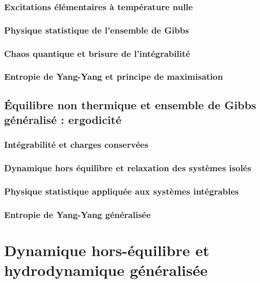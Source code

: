 \section{Excitations élémentaires à température nulle}
\section{Physique statistique de l’ensemble de Gibbs}

\section{Chaos quantique et brisure de l’intégrabilité}
\section{Entropie de Yang-Yang et principe de maximisation}

\chapter{Équilibre non thermique et ensemble de Gibbs généralisé : ergodicité}
\minitoc
\section{Intégrabilité et charges conservées}
\section{Dynamique hors équilibre et relaxation des systèmes isolés}
\section{Physique statistique appliquée aux systèmes intégrables}

\section{Entropie de Yang-Yang généralisée}

\part{Dynamique hors-équilibre et hydrodynamique généralisée}

